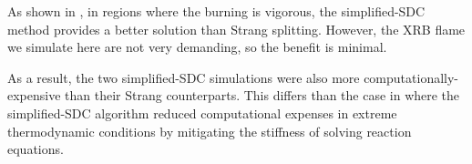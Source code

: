 \documentclass[preprint,times,tighten]{aastex631}
\begin{document}
\begin{comment}
\begin{figure*}
\centering
\plotone{integration_time_profile.pdf}
\caption{\label{fig:integration_profile} Time profiles showing weighted temperature and energy generation rate of the burning front for {\tt aprox13}, {\tt aprox13\_sdc}, {\tt subch\_full}, and {\tt subch\_full\_sdc}.}
\end{figure*}

\begin{figure*}
\centering
\plotone{integration_front.pdf}
\caption{\label{fig:integration_front} Flame front position as a function of time for {\tt aprox13}, {\tt aprox13\_sdc}, {\tt subch\_full}, and {\tt subch\_full\_sdc}. The dashed lines are the fitted curves using Eq. \ref{Eq:quadratic_fit} and Eq.\ref{Eq:tanh_fit}.}
\end{figure*}
\end{comment}

As shown in \citet{castro_simple_sdc}, in regions where the burning
is vigorous, the simplified-SDC method provides a better solution
than Strang splitting.  However, the XRB flame we simulate here
are not very demanding, so the benefit is minimal.  
\begin{comment}
is not extreme enough for nuclear statistical equilibrium to occur, any difference between simplified-SDC and Strang-splitting schemes is expected to be negligible. This is supported by the temperature and $\dot{e}_{\textrm{nuc}}$ profiles for {\tt aprox13\_sdc} and {\tt subch\_full\_sdc} shown in Figure \ref{fig:integration_profile}, which are almost identical, except for minor variations in $\dot{e}_{\textrm{nuc}}$ for {\tt subch\_full} and {\tt subch\_full\_sdc}. Similarly, the flame front position plots shown in Figure \ref{fig:integration_front} for the simplified-SDC simulations are nearly identical compared to their counterparts, with minor variations (Table \ref{Tab:network_instan_vel}) in the instantaneous flame speed calculated using the the fitting function. 
\end{comment}
As a result, the two simplified-SDC simulations were also more
computationally-expensive than their Strang counterparts.
This differs than the case in \citet{castro_simple_sdc} where 
the simplified-SDC algorithm reduced computational expenses in extreme thermodynamic conditions by mitigating the stiffness of solving reaction equations.


\end{document}
